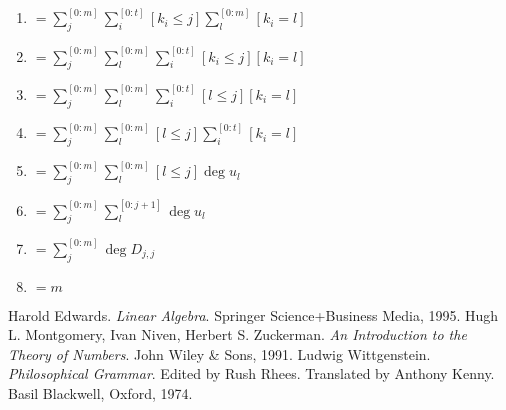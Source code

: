 \documentclass{article}
\begin{document}
\begin{multicols}{2}
\begin{enumerate}
\begin{enumerate}
						\item $=\sum_j^{[0:m]}\sum_i^{[0:t]} [k_i\le j]\sum_l^{[0:m]} [k_i=l]$
						\item $=\sum_j^{[0:m]}\sum_l^{[0:m]}\sum_i^{[0:t]} [k_i\le j][k_i=l]$
						\item $=\sum_j^{[0:m]}\sum_l^{[0:m]}\sum_i^{[0:t]} [l\le j][k_i=l]$
						\item $=\sum_j^{[0:m]}\sum_l^{[0:m]} [l\le j]\sum_i^{[0:t]} [k_i=l]$
						\item $=\sum_j^{[0:m]}\sum_l^{[0:m]} [l\le j]\deg u_l$
						\item $=\sum_j^{[0:m]}\sum_l^{[0:{j+1}]} \deg u_l$
						\item $=\sum_j^{[0:m]} \deg D_{j,j}$
						\item $=m$
					\end{enumerate}
				\end{enumerate}
	\end{multicols}
	\clearpage
	\begin{multicols}{2}
		\begingroup
			\renewcommand{\addcontentsline}[3]{}
			\begin{thebibliography}{9}
					Harold Edwards.
					\textit{Linear Algebra}. 
					Springer Science+Business Media, 1995.
					Hugh L. Montgomery, Ivan Niven, Herbert S. Zuckerman.
					\textit{An Introduction to the Theory of Numbers}.
					John Wiley \& Sons, 1991.
					Ludwig Wittgenstein.
					\textit{Philosophical Grammar}.
					Edited by Rush Rhees.
					Translated by Anthony Kenny.
					Basil Blackwell, Oxford, 1974.
			\end{thebibliography}
		\endgroup
	\end{multicols}
\end{document}

